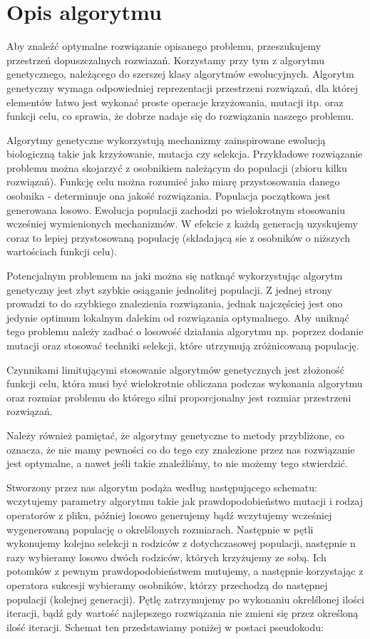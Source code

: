 \documentclass[12pt]{article}
\begin{document}
\section{Opis algorytmu}
Aby znaleźć optymalne rozwiązanie opisanego problemu, przeszukujemy przestrzeń dopuszczalnych rozwiazań. Korzystamy przy tym z algorytmu genetycznego, należącego do szerszej klasy algorytmów ewolucyjnych. Algorytm genetyczny wymaga odpowiedniej reprezentacji przestrzeni rozwiązań, dla której elementów łatwo jest wykonać proste operacje krzyżowania, mutacji itp. oraz funkcji celu, co sprawia, że dobrze nadaje się do rozwiązania naszego problemu. \par
Algorytmy genetyczne wykorzystują mechanizmy zainspirowane ewolucją biologiczną takie jak krzyżowanie, mutacja czy selekcja. Przykładowe rozwiązanie problemu można skojarzyć z osobnikiem należącym do populacji (zbioru kilku rozwiązań). Funkcję celu można rozumieć jako miarę przystosowania danego osobnika - determinuje ona jakość rozwiązania. Populacja początkowa jest generowana losowo. Ewolucja populacji zachodzi po wielokrotnym stosowaniu wcześniej wymienionych mechanizmów. W efekcie z każdą generacją uzyskujemy coraz to lepiej przystosowaną populację (składającą sie z osobników o niższych wartościach funkcji celu). \par
Potencjalnym problemem na jaki można się natknąć wykorzystując algorytm genetyczny jest zbyt szybkie osiąganie jednolitej populacji. Z jednej strony prowadzi to do szybkiego znalezienia rozwiązania, jednak najczęściej jest ono jedynie optimum lokalnym dalekim od rozwiązania optymalnego. Aby uniknąć tego problemu należy zadbać o losowość działania algorytmu np. poprzez dodanie mutacji oraz stosować techniki selekcji, które utrzymują zróżnicowaną populację. \par
Czynnikami limitującymi stosowanie algorytmów genetycznych jest złożoność funkcji celu, która musi być wielokrotnie obliczana podczas wykonania algorytmu oraz rozmiar problemu do którego silni proporcjonalny jest rozmiar przestrzeni rozwiązań. \par
Należy również pamiętać, że algorytmy genetyczne to metody przybliżone, co oznacza, że nie mamy pewności co do tego czy znalezione przez nas rozwiązanie jest optymalne, a nawet jeśli takie znaleźliśmy, to nie możemy tego stwierdzić. \par
Stworzony przez nas algorytm podąża według następującego schematu: wczytujemy parametry algorytmu takie jak prawdopodobieństwo mutacji i rodzaj operatorów z pliku, później losowo generujemy bądź wczytujemy wcześniej wygenerowaną populację o okrelślonych rozmiarach. Następnie w pętli wykonujemy kolejno selekcji n rodziców z dotychczasowej populacji, następnie n razy wybieramy losowo dwóch rodziców, których krzyżujemy ze sobą. Ich potomków z pewnym prawdopodobieństwem mutujemy, a następnie korzystając z operatora sukcesji wybieramy osobników, którzy przechodzą do następnej populacji (kolejnej generacji). Pętlę zatrzymujemy po wykonaniu okrelślonej ilości iteracji, bądź gdy wartość najlepszego rozwiązania nie zmieni się przez określoną ilość iteracji. Schemat ten przedstawiamy poniżej w postaci pseudokodu:
\end{document}
